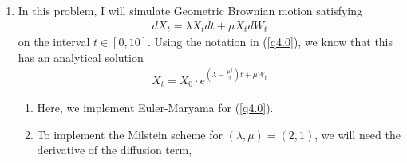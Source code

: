 \documentclass[12pt]{article}
\theoremstyle{plain}
\theoremstyle{definition}
\theoremstyle{remark}
\begin{document}
\begin{enumerate}
\begin{align*}
      \right)
      EX_n^2
    \end{align*}
    So then we have
    \begin{align*}
      \lim_{n\rightarrow\infty} EX_n^2 = 0
      \quad \Leftrightarrow \quad
      (1+\lambda\Delta t)^2 + \mu^2 \Delta t + \frac{\mu^4}{2}(\Delta t)^2
      < 1
    \end{align*}
    As in the EM case, let $y=\mu^2 \Delta t$ and $x=\lambda \Delta t$.
    This method then gives mean-square stability when
    \begin{align*}
      (1+x)^2 + y + \frac{1}{2} y^2 &< 1\\
      y + \frac{1}{2} y^2 &< 1- (1+x)^2 =1- (1+2x+x^2) \\
      y + \frac{1}{2} y^2 &< -x(2+x) \\
      1+2y + y^2 &< 1-2x(2+x) \\
      (1+y)^2 &< 1-2x(2+x) \\
      1+y &< \sqrt{1-2x(2+x)} \\
      y &< -1 + \sqrt{1-2x(2+x)}
    \end{align*}

  \item %
    In this problem, I will simulate Geometric Brownian motion
    satisfying
    \begin{align}
      \label{q4.0}
      dX_t = \lambda X_t dt + \mu X_t dW_t
    \end{align}
    on the interval $t\in[0,10]$. Using the notation in (\ref{q4.0}), we
    know that this has an analytical solution
    \begin{align}
      X_t = X_0 \cdot e^{\left(\lambda-\frac{\mu^2}{2}\right) t + \mu W_t}
      \label{q4.1}
    \end{align}
    \begin{enumerate}
      \item %
        Here, we implement Euler-Maryama for (\ref{q4.0}).

      \item %
        To implement the Milstein scheme for $(\lambda,\mu)=(2,1)$, we
        will need the derivative of the diffusion term,

    \end{enumerate}
\end{enumerate}

\clearpage
\appendix
\end{document}
